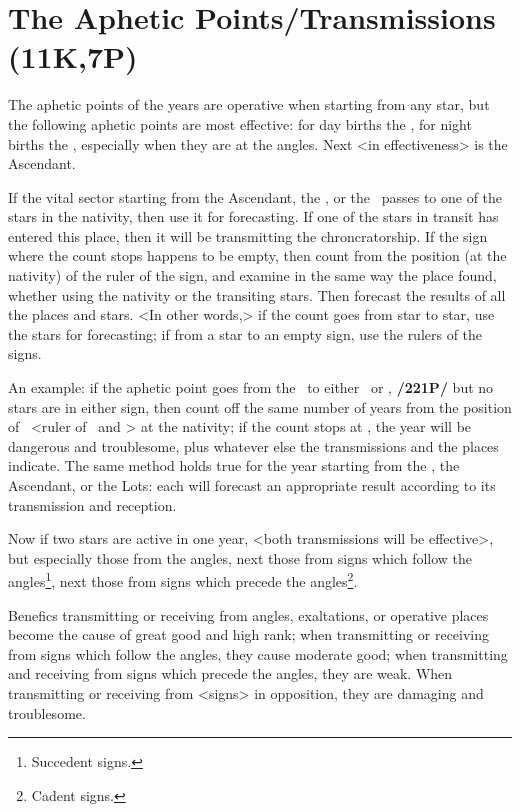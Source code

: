 \section{The Aphetic Points/Transmissions (11K,7P)}

The aphetic points of the years are operative when starting from any star, but the following aphetic points are most effective: for day births the \Sun, for night births the \Moon, especially when they are at the
angles. Next <in effectiveness> is the Ascendant. 

If \mndl the vital sector starting from the Ascendant, the \Moon, or the \Sun\, passes to one of the stars in the nativity, then use it for forecasting. If one of the stars in transit has entered this place, then it will be transmitting the chroncratorship. If the sign where the count stops happens to be empty, then count from the position (at the nativity) of the ruler of the sign, and examine in the same way the place found, whether using the nativity or the transiting stars. Then forecast the results of all the places and stars. <In other words,> if the count goes from star to star, use the stars for forecasting; if
from a star to an empty sign, use the rulers of the signs.

An example: if the aphetic point goes from the \Moon\, to either \Aries\, or \Scorpio, \textbf{/221P/} but no stars are
in either sign, then count off the same number of years from the position of \Mars\, <ruler of \Aries\, and \Scorpio> at the nativity; if the count stops at \Saturn, the year will be dangerous and troublesome, plus whatever else the transmissions and the places indicate. The same method holds true for the year starting from the \Sun, the Ascendant, or the Lots: each will forecast an appropriate result according to its transmission and reception.

Now if two stars are active in one year, <both transmissions will be effective>, but especially those from the angles, next those from signs which follow the angles\footnote{Succedent signs.}, next those from signs which precede the angles\footnote{Cadent signs.}. 

Benefics transmitting or receiving from angles, exaltations, or operative places become the cause of great good and high rank; when transmitting or receiving from signs which follow the angles, they cause moderate good; when transmitting and receiving from signs which precede the angles, they are weak. When transmitting or receiving from <signs> in opposition, they are damaging and troublesome. 

